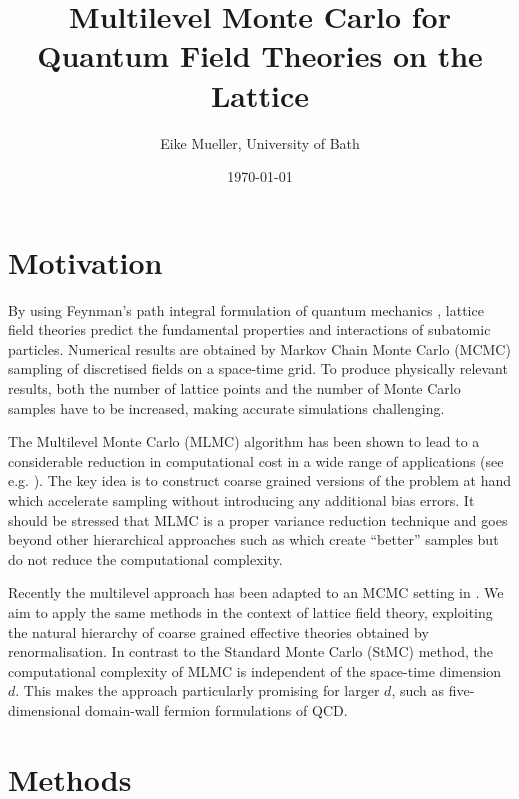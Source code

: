 \documentclass[11pt]{article}
\author{Eike Mueller, University of Bath}
\date{\today}
\title{Multilevel Monte Carlo for Quantum Field Theories on the Lattice}
\begin{document}
\maketitle
\section{Motivation}
By using Feynman's path integral formulation of quantum mechanics \cite{Feynman2010}, lattice field theories predict the fundamental properties and interactions of subatomic particles. Numerical results are obtained by Markov Chain Monte Carlo (MCMC) sampling of discretised fields on a space-time grid. To produce physically relevant results, both the number of lattice points and the number of Monte Carlo samples have to be increased, making accurate simulations challenging.

The Multilevel Monte Carlo (MLMC) algorithm \cite{Heinrich2001,Giles2008,Giles2015} has been shown to lead to a considerable reduction in computational cost in a wide range of applications (see e.g. \cite{Katsiolides2017}). The key idea is to construct coarse grained versions of the problem at hand which accelerate sampling without introducing any additional bias errors. It should be stressed that MLMC is a proper variance reduction technique and goes beyond other hierarchical approaches such as \cite{Faas1986} which create ``better'' samples but do not reduce the computational complexity.

Recently the multilevel approach has been adapted to an MCMC setting in \cite{Dodwell2015}. We aim to apply the same methods in the context of lattice field theory, exploiting the natural hierarchy of coarse grained effective theories obtained by renormalisation. In contrast to the Standard Monte Carlo (StMC) method, the computational complexity of MLMC is independent of the space-time dimension $d$. This makes the approach particularly promising for larger $d$, such as five-dimensional domain-wall fermion formulations \cite{Kaplan1992} of QCD. 
\section{Methods}

\end{document}
